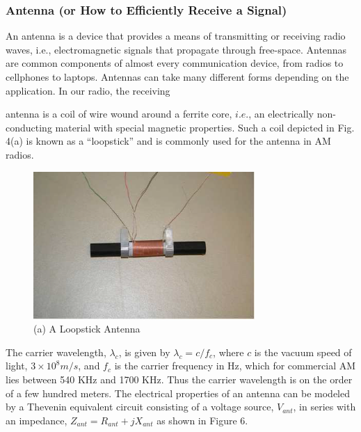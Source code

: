 \documentclass [utf8] {article}
\begin{document}
\subsubsection{Antenna (or How to Efficiently Receive a Signal)}
{
	An antenna is a device that provides a means of transmitting or receiving radio waves, i.e., electromagnetic signals that propagate through free-space. Antennas are common components of almost every communication device, from radios to cellphones to laptops.
	Antennas can take many different forms depending on the application. In our radio, the receiving

	antenna is a coil of wire wound around a ferrite core, $i.e.$, an electrically non-conducting material with special magnetic properties. Such a coil depicted in Fig. 4(a) is known as a “loopstick” and is commonly used for the antenna in AM radios.

	\begin{figure}[H]
		\begin{small}
			\begin{center}
				\includegraphics[width=0.75\textwidth]{figures/Figure4.png}
			\end{center}
			\caption{(a) A Loopstick Antenna}
			\label{fig:antenna}
		\end{small}
	\end{figure}

	The carrier wavelength, $\lambda_c$, is given by $\lambda_c = c/f_c$, where $c$ is the vacuum speed of light, $3\times10^8 m/s$, and $f_c$ is the carrier frequency in Hz, which for commercial AM lies between 540 KHz and 1700 KHz. Thus the carrier wavelength is on the order of a few hundred meters. The electrical properties of an antenna can be modeled by a Thevenin equivalent circuit consisting of a voltage source, $V_{ant}$, in series with an impedance, $Z_{ant} = R_{ant} + jX_{ant}$ as shown in Figure 6.

}
\end{document}
